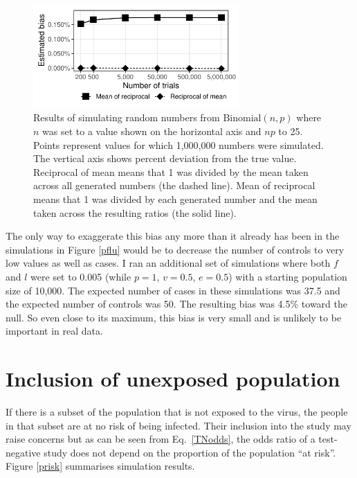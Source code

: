 \documentclass[12pt]{article}
\begin{document}
\pagebreak

\begin{figure}[htp]
	\centering
	\includegraphics[width=0.7\textwidth]{../binomial-reciprocal/npop.pdf}
	\caption{
	Results of simulating random numbers from $\text{Binomial}(n, p)$ where $n$ was set to a value shown on the horizontal axis and $np$ to 25. Points represent values for which 1,000,000 numbers were simulated. The vertical axis shows percent deviation from the true value. Reciprocal of mean means that 1 was divided by the mean taken across all generated numbers (the dashed line). Mean of reciprocal means that 1 was divided by each generated number and the mean taken across the resulting ratios (the solid line).
	}
	\label{npop}
\end{figure}

The only way to exaggerate this bias any more than it already has been in the simulations in Figure \ref{pflu} would be to decrease the number of controls to very low values as well as cases. I ran an additional set of simulations where both $f$ and $l$ were set to 0.005 (while $p=1$, $v=0.5$, $e=0.5$) with a starting population size of 10,000. The expected number of cases in these simulations was 37.5 and the expected number of controls was 50. The resulting bias was 4.5\% toward the null. So even close to its maximum, this bias is very small and is unlikely to be important in real data.

\pagebreak
%
\section{Inclusion of unexposed population}

If there is a subset of the population that is not exposed to the virus, the people in that subset are at no risk of being infected. Their inclusion into the study may raise concerns but as can be seen from Eq.\ \ref{TNodds}, the odds ratio of a test-negative study does not depend on the proportion of the population ``at risk''. Figure \ref{prisk} summarises simulation results.
\end{document}
